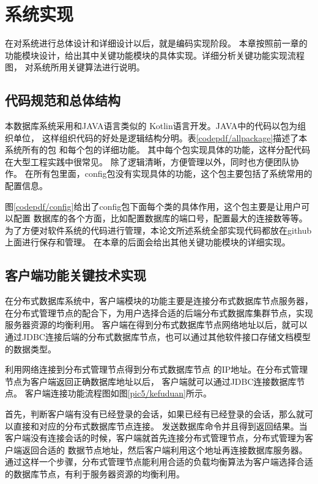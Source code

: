 
\chapter{系统实现}
在对系统进行总体设计和详细设计以后，就是编码实现阶段。
本章按照前一章的功能模块设计，给出其中关键功能模块的具体实现。详细分析关键功能实现流程图，
对系统所用关键算法进行说明。
\section{代码规范和总体结构}
本数据库系统采用和JAVA语言类似的
Kotlin语言开发。JAVA中的代码以包为组织单位，
这样组织代码的好处是逻辑结构分明。表\ref{codepdf/allpackage}描述了本系统所有的包
和每个包的详细功能。
其中每个包实现具体的功能，这样分配代码在大型工程实践中很常见。
除了逻辑清晰，方便管理以外，同时也方便团队协作。
在所有包里面，config包没有实现具体的功能，这个包主要包括了系统常用的配置信息。

图\ref{codepdf/config}给出了config包下面每个类的具体作用，这个包主要是让用户可以配置
数据库的各个方面，比如配置数据库的端口号，配置最大的连接数等等。为了方便对软件系统的代码进行管理，本论文所述系统全部实现代码都放在github上面进行保存和管理。
在本章的后面会给出其他关键功能模块的详细实现。
\section{客户端功能关键技术实现}
在分布式数据库系统中，客户端模块的功能主要是连接分布式数据库节点服务器，在分布式管理节点的配合下，为用户选择合适的后端分布式数据库集群节点，实现服务器资源的均衡利用。
客户端在得到分布式数据库节点网络地址以后，就可以通过JDBC连接后端的分布式数据库节点，也可以通过其他软件接口存储文档模型的数据类型。

利用网络连接到分布式管理节点得到分布式数据库节点
的IP地址。在分布式管理节点为客户端返回正确数据库地址以后，
客户端就可以通过JDBC连接数据库节点。
客户端连接功能流程图如图\ref{pic5/kefuduan}所示。

首先，判断客户端有没有已经登录的会话，如果已经有已经登录的会话，那么就可以直接和对应的分布式数据库节点连接。
发送数据库命令并且得到返回结果。当客户端没有连接会话的时候，客户端就首先连接分布式管理节点，分布式管理为客户端返回合适的
数据节点地址，然后客户端利用这个地址再连接数据库服务器。
通过这样一个步骤，分布式管理节点能利用合适的负载均衡算法为客户端选择合适的数据库节点，有利于服务器资源的均衡利用。
